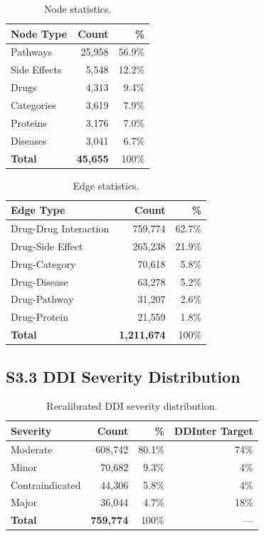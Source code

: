 \documentclass[11pt,a4paper]{article}
\begin{document}
\begin{table}[H]
\centering
\caption{Node statistics.}
\begin{tabular}{@{}lrr@{}}
\toprule
\textbf{Node Type} & \textbf{Count} & \textbf{\%} \\
\midrule
Pathways & 25,958 & 56.9\% \\
Side Effects & 5,548 & 12.2\% \\
Drugs & 4,313 & 9.4\% \\
Categories & 3,619 & 7.9\% \\
Proteins & 3,176 & 7.0\% \\
Diseases & 3,041 & 6.7\% \\
\midrule
\textbf{Total} & \textbf{45,655} & 100\% \\
\bottomrule
\end{tabular}
\end{table}

\begin{table}[H]
\centering
\caption{Edge statistics.}
\begin{tabular}{@{}lrr@{}}
\toprule
\textbf{Edge Type} & \textbf{Count} & \textbf{\%} \\
\midrule
Drug-Drug Interaction & 759,774 & 62.7\% \\
Drug-Side Effect & 265,238 & 21.9\% \\
Drug-Category & 70,618 & 5.8\% \\
Drug-Disease & 63,278 & 5.2\% \\
Drug-Pathway & 31,207 & 2.6\% \\
Drug-Protein & 21,559 & 1.8\% \\
\midrule
\textbf{Total} & \textbf{1,211,674} & 100\% \\
\bottomrule
\end{tabular}
\end{table}

\subsection{S3.3 DDI Severity Distribution}

\begin{table}[H]
\centering
\caption{Recalibrated DDI severity distribution.}
\begin{tabular}{@{}lrrr@{}}
\toprule
\textbf{Severity} & \textbf{Count} & \textbf{\%} & \textbf{DDInter Target} \\
\midrule
Moderate & 608,742 & 80.1\% & 74\% \\
Minor & 70,682 & 9.3\% & 4\% \\
Contraindicated & 44,306 & 5.8\% & 4\% \\
Major & 36,044 & 4.7\% & 18\% \\
\midrule
\textbf{Total} & \textbf{759,774} & 100\% & --- \\
\bottomrule
\end{tabular}
\end{table}
\end{document}
